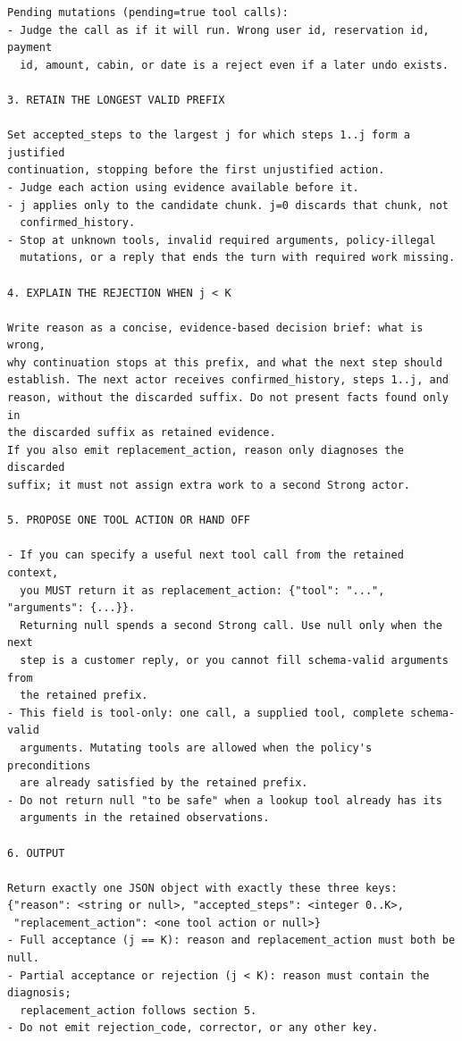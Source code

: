 \documentclass[11pt, copyright, logo, secondlogo]{template/lark}
\begin{document}
{\begin{verbatim}
Pending mutations (pending=true tool calls):
- Judge the call as if it will run. Wrong user id, reservation id, payment
  id, amount, cabin, or date is a reject even if a later undo exists.

3. RETAIN THE LONGEST VALID PREFIX

Set accepted_steps to the largest j for which steps 1..j form a justified
continuation, stopping before the first unjustified action.
- Judge each action using evidence available before it.
- j applies only to the candidate chunk. j=0 discards that chunk, not
  confirmed_history.
- Stop at unknown tools, invalid required arguments, policy-illegal
  mutations, or a reply that ends the turn with required work missing.

4. EXPLAIN THE REJECTION WHEN j < K

Write reason as a concise, evidence-based decision brief: what is wrong,
why continuation stops at this prefix, and what the next step should
establish. The next actor receives confirmed_history, steps 1..j, and
reason, without the discarded suffix. Do not present facts found only in
the discarded suffix as retained evidence.
If you also emit replacement_action, reason only diagnoses the discarded
suffix; it must not assign extra work to a second Strong actor.

5. PROPOSE ONE TOOL ACTION OR HAND OFF

- If you can specify a useful next tool call from the retained context,
  you MUST return it as replacement_action: {"tool": "...", "arguments": {...}}.
  Returning null spends a second Strong call. Use null only when the next
  step is a customer reply, or you cannot fill schema-valid arguments from
  the retained prefix.
- This field is tool-only: one call, a supplied tool, complete schema-valid
  arguments. Mutating tools are allowed when the policy's preconditions
  are already satisfied by the retained prefix.
- Do not return null "to be safe" when a lookup tool already has its
  arguments in the retained observations.

6. OUTPUT

Return exactly one JSON object with exactly these three keys:
{"reason": <string or null>, "accepted_steps": <integer 0..K>,
 "replacement_action": <one tool action or null>}
- Full acceptance (j == K): reason and replacement_action must both be null.
- Partial acceptance or rejection (j < K): reason must contain the diagnosis;
  replacement_action follows section 5.
- Do not emit rejection_code, corrector, or any other key.
\end{verbatim}
}
\end{document}
